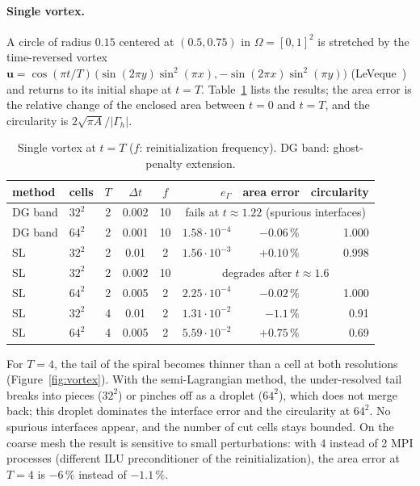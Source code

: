 \documentclass[11pt,a4paper]{article}
\newcommand{\uu}{\bm{u}}
\begin{document}
\paragraph{Single vortex.}
A circle of radius $0.15$ centered at $(0.5, 0.75)$ in $\Omega = [0,1]^2$ is stretched by the
time-reversed vortex $\uu = \cos(\pi t/T)\,\big(\sin(2\pi y)\sin^2(\pi x),
-\sin(2\pi x)\sin^2(\pi y)\big)$ (LeVeque~\cite{LeVeque1996}) and returns to its initial shape at
$t = T$. Table~\ref{tab:vortex} lists the results; the area error is the relative change of the
enclosed area between $t = 0$ and $t = T$, and the circularity is $2\sqrt{\pi A}/|\Gamma_h|$.

\begin{table}[ht]
  \centering
  \small
  \caption{Single vortex at $t = T$ ($f$: reinitialization frequency). DG band: ghost-penalty
  extension.}
  \label{tab:vortex}
  \begin{tabular}{@{}llcccrrr@{}}
    \toprule
    method & cells & $T$ & $\Delta t$ & $f$ & $e_\Gamma$ & area error & circularity \\
    \midrule
    DG band & $32^2$ & 2 & 0.002 & 10 & \multicolumn{3}{c}{fails at $t \approx 1.22$ (spurious interfaces)} \\
    DG band & $64^2$ & 2 & 0.001 & 10 & $1.58\cdot10^{-4}$ & $-0.06\,\%$ & 1.000 \\
    SL      & $32^2$ & 2 & 0.01  & 2  & $1.56\cdot10^{-3}$ & $+0.10\,\%$ & 0.998 \\
    SL      & $32^2$ & 2 & 0.002 & 10 & \multicolumn{3}{c}{degrades after $t \approx 1.6$} \\
    SL      & $64^2$ & 2 & 0.005 & 2  & $2.25\cdot10^{-4}$ & $-0.02\,\%$ & 1.000 \\
    SL      & $32^2$ & 4 & 0.01  & 2  & $1.31\cdot10^{-2}$ & $-1.1\,\%$  & 0.91 \\
    SL      & $64^2$ & 4 & 0.005 & 2  & $5.59\cdot10^{-2}$ & $+0.75\,\%$ & 0.69 \\
    \bottomrule
  \end{tabular}
\end{table}

For $T = 4$, the tail of the spiral becomes thinner than a cell at both resolutions
(Figure~\ref{fig:vortex}). With the semi-Lagrangian method, the under-resolved tail breaks into
pieces ($32^2$) or pinches off as a droplet ($64^2$), which does not merge back; this droplet
dominates the interface error and the circularity at $64^2$. No spurious interfaces appear, and the
number of cut cells stays bounded. On the coarse mesh the result is sensitive to small
perturbations: with 4 instead of 2 MPI processes (different ILU preconditioner of the
reinitialization), the area error at $T = 4$ is $-6\,\%$ instead of $-1.1\,\%$.
\end{document}
